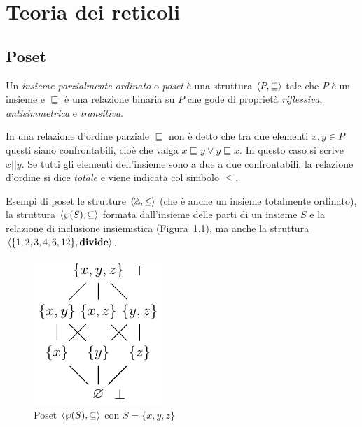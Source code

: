 \newcommand{\uco}{\fun{uco}}
\newcommand{\lfp}{\fun{lfp}}

\chapter{Teoria dei reticoli}\label{chap:teoriareticoli}

\section{Poset}

\begin{definition}[Poset]
Un \emph{insieme parzialmente ordinato} o \emph{poset} è una struttura $\langle P, \sqsubseteq \rangle$ tale che $P$ è un insieme e $\sqsubseteq$ è una relazione binaria su $P$ che gode di proprietà \emph{riflessiva}, \emph{antisimmetrica} e \emph{transitiva}. 
\end{definition}

In una relazione d'ordine parziale $\sqsubseteq$ non è detto che tra due elementi $x,y \in P$ questi siano confrontabili, cioè che valga $x \sqsubseteq y \lor y \sqsubseteq x$. In questo caso si scrive $x || y$. Se tutti gli elementi dell'insieme sono a due a due confrontabili, la relazione d'ordine si dice \emph{totale} e viene indicata col simbolo $\le$. 

Esempi di poset le strutture $\langle \mathbb{Z}, \le \rangle$ (che è anche un insieme totalmente ordinato), la struttura $\langle \wp(S), \subseteq \rangle$ formata dall'insieme delle parti di un insieme $S$ e la relazione di inclusione insiemistica (Figura~\ref{fig:poset-parti}), ma anche la struttura $\langle \{1,2,3,4,6,12\}, \mathbf{divide} \rangle$.

\begin{figure}[htbp]
    \centering
    \includegraphics{appendici/immagini/poset-parti.pdf}
    \caption{Poset $\langle \wp(S), \subseteq \rangle$ con $S = \{x,y,z\}$}
    \label{fig:poset-parti}
\end{figure}

